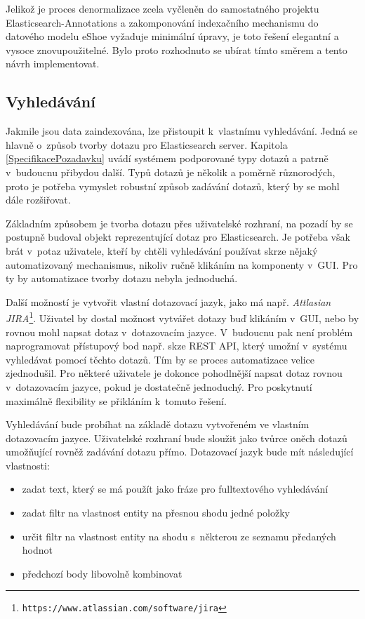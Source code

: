 \documentclass[11pt,oneside]{fithesis2}
\begin{document}
Jelikož je proces denormalizace zcela vyčleněn do samostatného projektu \mbox{Elasticsearch-Annotations} a zakomponování indexačního mechanismu do datového modelu eShoe vyžaduje minimální úpravy, je toto řešení elegantní a vysoce znovupoužitelné. Bylo proto rozhodnuto se ubírat tímto směrem a tento návrh implementovat.

\subsection{Vyhledávání}
Jakmile jsou data zaindexována, lze přistoupit k~vlastnímu vyhledávání. Jedná se hlavně o~způsob tvorby dotazu pro Elasticsearch server. Kapitola \ref{SpecifikacePozadavku} uvádí systémem podporované typy dotazů a patrně v~budoucnu přibydou další. Typů dotazů je několik a poměrně různorodých, proto je potřeba vymyslet robustní způsob zadávání dotazů, který by se mohl dále rozšiřovat.

Základním způsobem je tvorba dotazu přes uživatelské rozhraní, na pozadí by se postupně budoval objekt reprezentující dotaz pro Elasticsearch. Je potřeba však brát v~potaz uživatele, kteří by chtěli vyhledávání používat skrze nějaký automatizovaný mechanismus, nikoliv ručně klikáním na komponenty v~GUI. Pro ty by automatizace tvorby dotazu nebyla jednoduchá.

Další možností je vytvořit vlastní dotazovací jazyk, jako má např. \emph{Attlasian JIRA}\footnote{\texttt{https://www.atlassian.com/software/jira}}. Uživatel by dostal možnost vytvářet dotazy buď klikáním v~GUI, nebo by rovnou mohl napsat dotaz v~dotazovacím jazyce. V~budoucnu pak není problém naprogramovat přístupový bod např. skze REST API, který umožní v~systému vyhledávat pomocí těchto dotazů. Tím by se proces automatizace velice zjednodušil. Pro některé uživatele je dokonce pohodlnější napsat dotaz rovnou v~dotazovacím jazyce, pokud je dostatečně jednoduchý. Pro poskytnutí maximálně flexibility se přikláním k~tomuto řešení.

Vyhledávání bude probíhat na základě dotazu vytvořeném ve vlastním dotazovacím jazyce. Uživatelské rozhraní bude sloužit jako tvůrce oněch dotazů umožňující rovněž zadávání dotazu přímo. Dotazovací jazyk bude mít následující vlastnosti:
\begin{itemize}
	\item zadat text, který se má použít jako fráze pro fulltextového vyhledávání
	\item zadat filtr na vlastnost entity na přesnou shodu jedné položky
	\item určit filtr na vlastnost entity na shodu s~některou ze seznamu předaných hodnot
	\item předchozí body libovolně kombinovat
\end{itemize}
\end{document}
